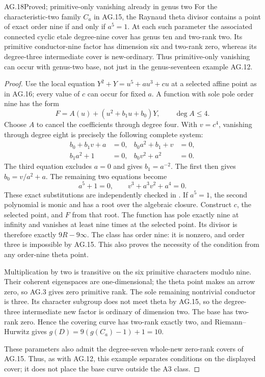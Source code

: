 \begin{claim}{AG.18}{Proved; primitive-only vanishing already in genus two}
For the characteristic-two family $C_a$ in AG.15,
the Raynaud theta divisor contains a point of exact
order nine if and only if $a^5=1$.
At each such parameter the associated connected
cyclic etale degree-nine cover has genus ten and
two-rank two. Its primitive conductor-nine factor
has dimension six and two-rank zero, whereas its
degree-three intermediate cover is new-ordinary.
Thus primitive-only vanishing can occur with genus-two
base, not just in the genus-seventeen example AG.12.
\end{claim}
\begin{proof}
Use the local equation
$Y^2+Y=u^5+a u^3+c u$ at a selected affine point as
in AG.16; every value of $c$ can occur for fixed $a$.
A function with sole pole order nine has the form
\[
 F=A(u)+(u^2+b_1u+b_0)Y,\qquad \deg A\le4.
\]
Choose $A$ to cancel the coefficients through degree
four. With $v=c^4$, vanishing through degree eight
is precisely the following complete system:
\[
 \begin{aligned}
 b_0+b_1v+a&=0,& b_0a^2+b_1+v&=0,\\
 b_1a^2+1&=0,& b_0v^2+a^2&=0.
 \end{aligned}
\]
The third equation excludes $a=0$ and gives
$b_1=a^{-2}$. The first then gives
$b_0=v/a^2+a$. The remaining two equations become
\[
                  a^5+1=0,
       \qquad v^3+a^3v^2+a^4=0.
\]
These exact substitutions are independently checked in
. If $a^5=1$, the
second polynomial is monic and has a root over the
algebraic closure. Construct $c$, the selected point,
and $F$ from that root. The function has pole exactly
nine at infinity and vanishes at least nine times at
the selected point. Its divisor is therefore exactly
$9R-9\infty$. The class has order nine: it is nonzero,
and order three is impossible by AG.15. This also
proves the necessity of the condition from any
order-nine theta point.

Multiplication by two is transitive on the six primitive
characters modulo nine. Their coherent eigenspaces are
one-dimensional; the theta point makes an arrow zero,
so AG.3 gives zero primitive rank. The sole remaining
nontrivial conductor is three. Its character subgroup
does not meet theta by AG.15, so the degree-three
intermediate new factor is ordinary of dimension two.
The base has two-rank zero. Hence the covering curve
has two-rank exactly two, and Riemann--Hurwitz gives
$g(D)=9(g(C_a)-1)+1=10$.

These parameters also admit the degree-seven whole-new
zero-rank covers of AG.15. Thus, as with AG.12, this
example separates conditions on the displayed cover;
it does not place the base curve outside the A3 class.
\end{proof}

